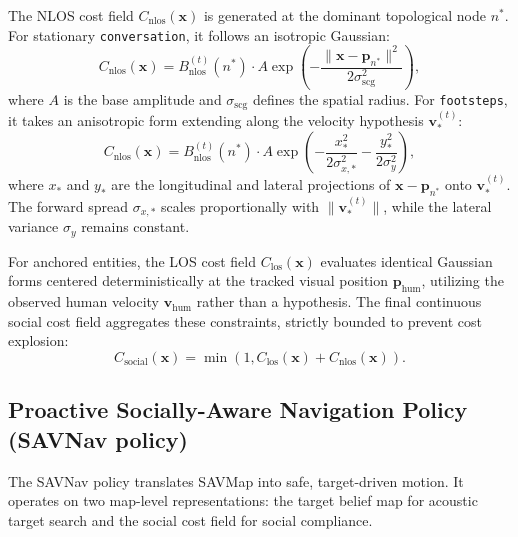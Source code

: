 The NLOS cost field $C_{\mathrm{nlos}}(\mathbf{x})$ is generated at the dominant topological node $n^*$. For stationary \texttt{conversation}, it follows an isotropic Gaussian:
\begin{equation}
    C_{\mathrm{nlos}}(\mathbf{x}) = B_{\mathrm{nlos}}^{(t)}(n^*) \cdot A \exp\left(-\frac{\|\mathbf{x} - \mathbf{p}_{n^*}\|^2}{2\sigma^2_{\mathrm{scg}}}\right),
    \label{eq:scg_cost}
\end{equation}
where $A$ is the base amplitude and $\sigma_{\mathrm{scg}}$ defines the spatial radius. For \texttt{footsteps}, it takes an anisotropic form extending along the velocity hypothesis $\mathbf{v}_{*}^{(t)}$:
\begin{equation}
    C_{\mathrm{nlos}}(\mathbf{x}) = B_{\mathrm{nlos}}^{(t)}(n^*) \cdot A \exp \left( - \frac{x_*^2}{2\sigma_{x,*}^2} - \frac{y_*^2}{2\sigma_y^2} \right),
    \label{eq:dp_cost}
\end{equation}
where $x_*$ and $y_*$ are the longitudinal and lateral projections of $\mathbf{x} - \mathbf{p}_{n^*}$ onto $\mathbf{v}_{*}^{(t)}$. The forward spread $\sigma_{x,*}$ scales proportionally with $\|\mathbf{v}_{*}^{(t)}\|$, while the lateral variance $\sigma_y$ remains constant.

For anchored entities, the LOS cost field $C_{\mathrm{los}}(\mathbf{x})$ evaluates identical Gaussian forms centered deterministically at the tracked visual position $\mathbf{p}_{\mathrm{hum}}$, utilizing the observed human velocity $\mathbf{v}_{\mathrm{hum}}$ rather than a hypothesis. The final continuous social cost field aggregates these constraints, strictly bounded to prevent cost explosion:
\begin{equation}
    C_{\mathrm{social}}(\mathbf{x}) = \min\left(1, C_{\mathrm{los}}(\mathbf{x}) + C_{\mathrm{nlos}}(\mathbf{x})\right).
    \label{eq:final_cost}
\end{equation}

\subsection{Proactive Socially-Aware Navigation Policy (SAVNav policy)}
\label{subsec:savnav}

The SAVNav policy translates SAVMap into safe, target-driven motion. It operates on two map-level representations: the target belief map for acoustic target search and the social cost field for social compliance.

